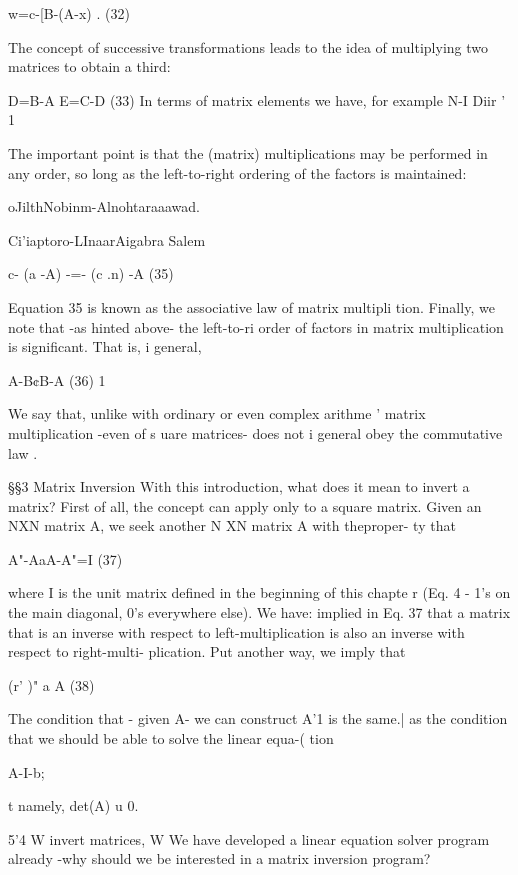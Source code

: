 w=c-[B-(A-x) . (32)

 

The concept of successive transformations leads to the idea of
multiplying two matrices to obtain a third:

D=B-A E=C-D (33)
In terms of matrix elements we have, for example
N-I
Diir ' 1%

The important point is that the (matrix) multiplications may be
performed in any order, so long as the left-to-right ordering of
the factors is maintained:

oJilthNobinm-Alnohtaraaawad.

Ci'iaptoro-LInaarAigabra Salem

   
  
  
  
  

c- (a -A) -=- (c .n) -A (35)

Equation 35 is known as the associative law of matrix multipli
tion. Finally, we note that -as hinted above- the left-to-ri
order of factors in matrix multiplication is significant. That is, i
general,

A-B¢B-A (36) 1

We say that, unlike with ordinary or even complex arithme '
matrix multiplication -even of s uare matrices- does not i
general obey the commutative law .

\S\S3 Matrix Inversion
With this introduction, what does it mean to invert a matrix? First
of all, the concept can apply only to a square matrix. Given an
NXN matrix A, we seek another N XN matrix A with theproper-
ty that

 

A"-AaA-A"=I (37)

where I is the unit matrix defined in the beginning of this chapte r
(Eq. 4 - 1's on the main diagonal, 0's everywhere else). We have:
implied in Eq. 37 that a matrix that is an inverse with respect to
left-multiplication is also an inverse with respect to right-multi-
plication. Put another way, we imply that

(r' )" a A (38)

The condition that - given A- we can construct A'1 is the same.|
as the condition that we should be able to solve the linear equa-(
tion

A-I-b;

t namely, det(A) u 0.

5'4 W invert matrices, W
We have developed a linear equation solver program already
-why should we be interested in a matrix inversion program?

